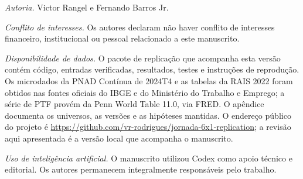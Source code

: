 \documentclass[12pt]{article}
\begin{document}
\textit{Autoria.} Victor Rangel e Fernando Barros Jr.

\textit{Conflito de interesses.} Os autores declaram n\~ao haver conflito de interesses financeiro, institucional ou pessoal relacionado a este manuscrito.

\textit{Disponibilidade de dados.} O pacote de replicação que acompanha esta versão contém código, entradas verificadas, resultados, testes e instruções de reprodução. Os microdados da PNAD Contínua de 2024T4 e as tabelas da RAIS 2022 foram obtidos nas fontes oficiais do IBGE e do Ministério do Trabalho e Emprego; a série de PTF provém da Penn World Table 11.0, via FRED. O apêndice documenta os universos, as versões e as hipóteses mantidas. O endereço público do projeto é \url{https://github.com/vr-rodrigues/jornada-6x1-replication}; a revisão aqui apresentada é a versão local que acompanha o manuscrito.

\textit{Uso de intelig\^encia artificial.} O manuscrito utilizou Codex como apoio t\'ecnico e editorial. Os autores permanecem integralmente respons\'aveis pelo trabalho.
\end{document}
